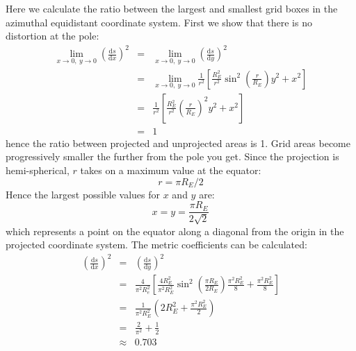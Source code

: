 Here we calculate the ratio between the largest and smallest grid boxes in the
azimuthal equidistant coordinate system.
First we show that there is no distortion at the pole:
\begin{eqnarray}
	\lim_{x\rightarrow 0, ~y\rightarrow 0} \left (\frac{\mathrm ds}{\mathrm d x} \right )^2 & = & 
	\lim_{x\rightarrow 0, ~y\rightarrow 0} \left (\frac{\mathrm ds}{\mathrm d y} \right )^2  \\
	& = & \lim_{x\rightarrow 0, ~y\rightarrow 0} \frac{1}{r^2} \left [
	\frac{R_E^2}{r^2} \sin^2 \left (\frac{r}{R_E} \right ) y^2 + x^2 \right ] \\
 & = & \frac{1}{r^2} \left [\frac{R_E^2}{r^2} \left (\frac{r}{R_E} \right )^2
	y^2 + x^2 \right ] \\ 
	& = & 1
\end{eqnarray}
hence the ratio between projected and unprojected areas is 1.
Grid areas become progressively smaller the further from the pole you get.
Since the projection is hemi-spherical, $r$ takes on a maximum value at the
equator:
\begin{equation}
	r=\pi R_E/2
\end{equation}
Hence the largest possible values for $x$ and $y$ are:
\begin{equation}
	x = y = \frac{\pi R_E}{2 \sqrt{2}}
\end{equation}
which represents a point on the equator along a diagonal from the origin 
in the projected coordinate system.
The metric coefficients can be calculated:
\begin{eqnarray}
	\left (\frac{\mathrm ds}{\mathrm d x} \right )^2 & = & 
	\left (\frac{\mathrm ds}{\mathrm d y} \right )^2 \\
     & = & \frac{4}{\pi^2 R_e^2} \left [
	\frac{4 R_E^2}{\pi^2 R_E^2} \sin^2 \left (\frac{\pi R_E}{2 R_E} \right ) 
\frac{\pi^2 R_E^2}{8} + \frac{\pi^2 R_E^2}{8} \right ] \\
& = & \frac{1}{\pi^2 R_E^2} \left ( 2 R_E^2 + \frac{\pi^2 R_E^2}{2} \right ) \\
& = & \frac{2}{\pi^2} + \frac{1}{2} \\
& \approx & 0.703
\end{eqnarray}
